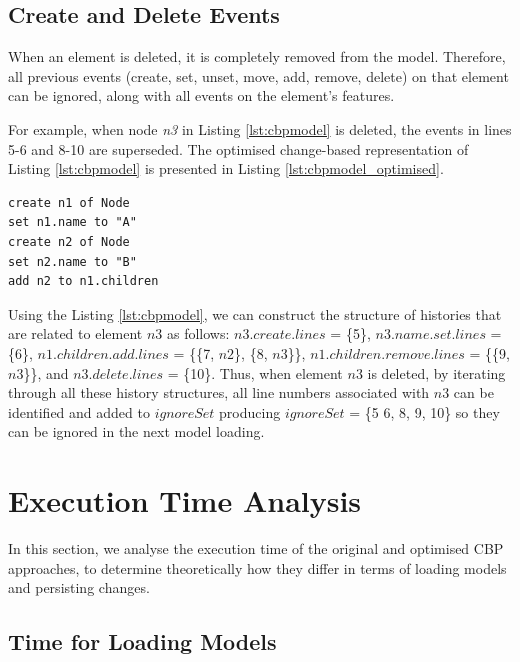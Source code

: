 \documentclass{llncs}
\begin{document}
    
    \subsection{Create and Delete Events}
    \label{subsec:create_and_delete_operations}
    
    When an element is deleted, it is completely removed from the model. Therefore, all previous events (create, set, unset, move, add, remove, delete) on that element can be ignored, along with all events on the element's features. 
    
    For example, when node \emph{n3} in Listing \ref{lst:cbpmodel} is deleted, the events in lines 5-6 and 8-10 are superseded. The optimised change-based representation of Listing \ref{lst:cbpmodel} is presented in Listing \ref{lst:cbpmodel_optimised}.
    
    \begin{lstlisting}[style=eol,caption={Change-based representation of the model in Fig. \ref{fig:initial_model} after removal of node \emph{n3}.},label=lst:cbpmodel_optimised]
create n1 of Node
set n1.name to "A"
create n2 of Node
set n2.name to "B"
add n2 to n1.children
    \end{lstlisting}
    
    Using the Listing \ref{lst:cbpmodel}, we can construct the structure of histories that are related to element $n3$ as follows: $n3$.$create$.$lines$ = \{5\}, $n3$.$name$.$set$.$lines$ = \{6\}, $n1$.$children$.$add$.$lines$ = \{\{7, $n2$\}, \{8, $n3$\}\}, $n1$.$children$.$remove$.$lines$ = \{\{9, $n3$\}\}, and $n3$.$delete$.$lines$ = \{10\}. Thus, when element $n3$ is deleted, by iterating through all these history structures, all line numbers associated with $n3$ can be identified and added to $ignoreSet$ producing $ignoreSet$ = \{5 6, 8, 9, 10\} so they can be ignored in the next model loading.
    
    \section{Execution Time Analysis}
    \label{sec:complexity_analysis}
    
    In this section, we analyse the execution time of the original and optimised CBP approaches, to determine theoretically how they differ in terms of loading models and persisting changes.   
    
    \subsection{Time for Loading Models}
    
\end{document}
